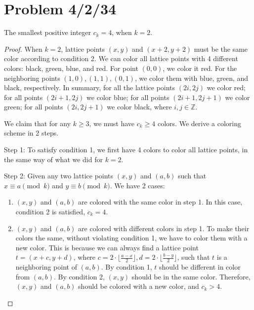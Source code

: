 \documentclass[11pt, oneside]{article}   	%
\begin{document}
 \newpage
 \section{Problem 4/2/34}


The smallest positive integer $c_k=4$, when $k=2$.
\begin{proof}

When $k=2$, lattice points $(x, y)$ and $(x+2, y+2)$ must be the same color according to condition 2. We can color all lattice points with 4 different colors: black, green, blue, and red. For point $(0, 0)$, we color it red. For the neighboring points $(1, 0), (1, 1), (0, 1)$, we color them with blue, green, and black, respectively. In summary, for all the lattice points $(2i, 2j)$ we color red; for all points $(2i+1, 2j)$ we color blue; for all points $(2i+1, 2j+1)$ we color green; for all points $(2i, 2j+1)$ we color black, where $i, j \in \mathbb{Z}$.

We claim that for any $k\ge 3$, we must have $c_k\ge 4$ colors. We derive a coloring scheme in 2 steps.

Step 1: To satisfy condition 1, we first have 4 colors to color all lattice points,  in the same way of what we did for $k=2$. 

Step 2: Given any two lattice points $(x, y)$ and $(a, b)$ such that $x\equiv a \pmod k$ and $y\equiv b \pmod k$.  We have 2 cases: 
\begin{enumerate}
\item $(x, y)$ and $(a, b)$  are colored with the same color in step 1. In this case, condition 2 is satisfied, $c_k=4$.

\item $(x, y)$ and $(a, b)$ are colored with different colors in step 1. To make their colors the same, without violating condition 1, we have to color them with a new color. This is because we can always find a lattice point $t = (x+c, y+d)$, where $c=2\cdot \lfloor\frac{a-x}{2}\rfloor, d=2\cdot \lfloor\frac{b-y}{2}\rfloor$, such that $t$ is a neighboring point of $(a, b)$. By condition 1, $t$ should be different in color from $(a, b)$. By condition 2, $(x, y)$ should be in the same color. Therefore, $(x, y)$ and $(a, b)$ should be colored with a new color, and $c_k> 4$. 


\end{enumerate}







\end{proof}
\end{document}
